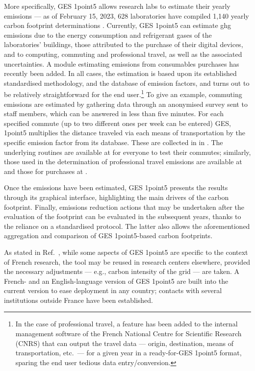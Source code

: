 \documentclass[../SustainableHEP.tex]{subfiles}
\begin{document}
\begin{bestpractice}
More specifically, GES 1point5 allows research labs to
estimate their yearly emissions --- as of February 15, 2023,
628 laboratories have compiled 1,140 yearly carbon footprint 
determinations \cite{labos1p5web}.
Currently, GES 1point5 can estimate \acrshort{ghg} emissions 
due to the energy consumption and refrigerant gases of the laboratories' buildings, 
those attributed to the purchase of their digital devices, and to computing, 
commuting and professional travel, as well as the associated uncertainties.
A module estimating emissions from consumables purchases has recently been added.
In all cases, the estimation is based upon its established
standardised methodology, and the database of emission factors, and turns out 
to be relatively straightforward for the end user.\footnote{In the case
of professional travel, a feature has been added to the internal management software
of the French National Centre for Scientific Research (CNRS) that can output the travel data --- origin, destination, means of transportation, etc.~---
for a given year in a ready-for-GES 1point5 format,
sparing the end user tedious data entry/conversion.} To give an example, 
commuting emissions are estimated by gathering data through an anonymised survey
sent to staff members, which can be answered in less than five minutes.
For each specified commute (up to two different ones per week can be entered)
GES, 1point5 multiplies the distance traveled via each means of transportation by
the specific emission factor from its database. These are collected in  in .
The underlying routines are available at \cite{1p5commute} for everyone to test their 
commutes; similarly, those used in the determination of professional travel emissions are 
available at \cite{1p5travel} and those for purchases at 
\cite{1p5purchases}.

Once the emissions have been estimated, GES 1point5 presents the results 
through its graphical interface, highlighting the main drivers of the carbon footprint. 
Finally, emissions reduction actions that may be undertaken after the evaluation of the 
footprint can be evaluated in the subsequent years, thanks to the reliance
on a standardised protocol. The latter also allows the aforementioned 
aggregation and comparison of GES 1point5-based carbon footprints.

As stated in Ref.~\cite{labos1p5}, while some aspects of GES 1point5 are specific 
to the context of French research, the tool  may be reused in research centers elsewhere, provided
the necessary adjustments --- e.g., carbon intensity of the grid --- are taken. 
A French- and an English-language version of GES 1point5 are built into the current version to ease deployment in any country; contacts with several institutions outside France 
have been established.
\end{bestpractice}
\end{document}
